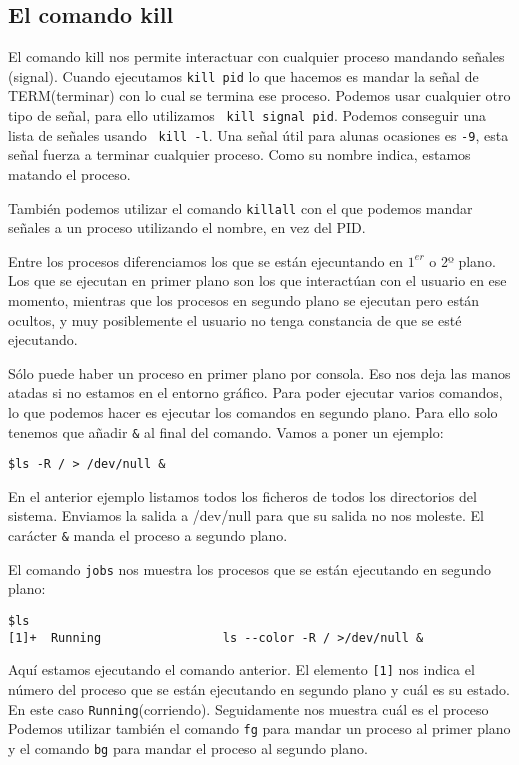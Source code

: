 \subsection{El comando kill}
El comando kill nos permite interactuar con cualquier proceso mandando
señales (signal). Cuando  ejecutamos {\tt kill pid} lo  que hacemos es
mandar la señal de TERM(terminar) con  lo cual se termina ese proceso.
Podemos usar cualquier  otro tipo de señal, para  ello utilizamos {\tt
kill signal pid}.  Podemos conseguir una lista de  señales usando {\tt
kill -l}. Una señal útil para alunas ocasiones es {\tt -9}, esta señal
fuerza a  terminar cualquier proceso.  Como su nombre  indica, estamos
matando el proceso.

También podemos utilizar el comando  {\tt killall} con el que podemos
mandar señales a un proceso utilizando el nombre, en vez del PID.

Entre  los procesos  diferenciamos  los que  se  están ejecuntando  en
$1^{er}$ o 2º  plano. Los que se  ejecutan en primer plano  son los que
interactúan con el  usuario en ese momento, mientras  que los procesos
en segundo plano se ejecutan pero están ocultos, y muy posiblemente el
usuario no tenga constancia de que se esté ejecutando.

Sólo puede haber un proceso en  primer plano por consola. Eso nos deja
las  manos atadas  si no  estamos en  el entorno  gráfico. Para  poder
ejecutar  varios  comandos,  lo  que podemos  hacer  es  ejecutar  los
comandos en segundo plano. Para  ello solo tenemos que añadir \verb.&.
al final del comando. Vamos a poner un ejemplo:

\begin{verbatim}
$ls -R / > /dev/null &
\end{verbatim}

En  el anterior  ejemplo  listamos  todos los  ficheros  de todos  los
directorios del  sistema. Enviamos la  salida a /dev/null para  que su
salida no nos moleste. El carácter \verb.&. manda el proceso a segundo
plano.

El comando {\tt jobs} nos muestra los procesos que se están ejecutando
en segundo plano:

\begin{verbatim}
$ls
[1]+  Running                 ls --color -R / >/dev/null &
\end{verbatim}

Aquí estamos ejecutando el comando anterior. El elemento {\tt [1]} nos
indica  el número  del  proceso  que se  están  ejecutando en  segundo
plano  y cuál  es su  estado. En  este caso  {\tt Running}(corriendo).
Seguidamente nos muestra  cuál es el proceso  Podemos utilizar también
el  comando {\tt  fg} para  mandar  un proceso  al primer  plano y  el
comando {\tt bg} para mandar el proceso al segundo plano.


